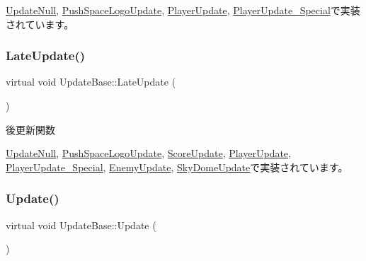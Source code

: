 \mbox{\hyperlink{class_update_null_a77aee1e614cf6dafe4f9af58b2205e4b}{Update\+Null}}, \mbox{\hyperlink{class_push_space_logo_update_ab18a0c905455da17f9e2f1fe5f0c34e6}{Push\+Space\+Logo\+Update}}, \mbox{\hyperlink{class_player_update_ac15fd0faf356c6e66f6c62c2b6b8d3ac}{Player\+Update}}, \mbox{\hyperlink{class_player_update___special_a6253000b53b2c5bc73ce0ed4d3b4a82a}{Player\+Update\+\_\+\+Special}}で実装されています。

\mbox{\label{class_update_base_afc4956f78135aed5fc4e4f9991be50b9}} 
\subsubsection{\texorpdfstring{Late\+Update()}{LateUpdate()}}
{\footnotesize\ttfamily virtual void Update\+Base\+::\+Late\+Update (\begin{DoxyParamCaption}{ }\end{DoxyParamCaption})\hspace{0.3cm}{\ttfamily [pure virtual]}}



後更新関数 



\mbox{\hyperlink{class_update_null_ac68da1ba7f3fbcae833442bb1c169200}{Update\+Null}}, \mbox{\hyperlink{class_push_space_logo_update_a4423864fb22b1211e92a4317d0b70a44}{Push\+Space\+Logo\+Update}}, \mbox{\hyperlink{class_score_update_adc9a48f54828e49c072c298777935893}{Score\+Update}}, \mbox{\hyperlink{class_player_update_ae376f517f3458edfef61ac366aa78e36}{Player\+Update}}, \mbox{\hyperlink{class_player_update___special_a1daae8fdcd87bf907313a98e022f254c}{Player\+Update\+\_\+\+Special}}, \mbox{\hyperlink{class_enemy_update_ae14e4ebb42ad9043534e53edcba5b242}{Enemy\+Update}}, \mbox{\hyperlink{class_sky_dome_update_a94347cb50b4dc13528738a7b812da261}{Sky\+Dome\+Update}}で実装されています。

\mbox{\label{class_update_base_a9fdc8924001cf6fa89c1f5fa0d867682}} 
\subsubsection{\texorpdfstring{Update()}{Update()}}
{\footnotesize\ttfamily virtual void Update\+Base\+::\+Update (\begin{DoxyParamCaption}{ }\end{DoxyParamCaption})\hspace{0.3cm}{\ttfamily [pure virtual]}}



